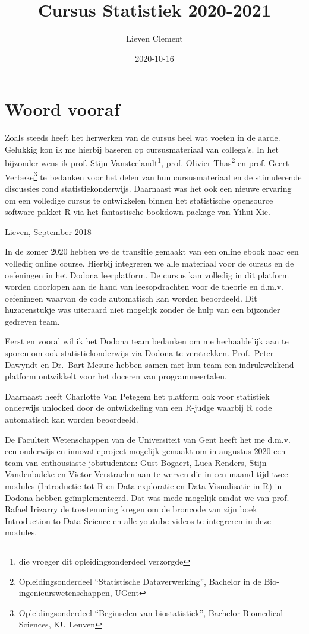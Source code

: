 \documentclass[
  12pt,dutch,coursenotes]{book}
\title{Cursus Statistiek 2020-2021}
\author{Lieven Clement}
\date{2020-10-16}
\theoremstyle{definition}
\theoremstyle{definition}
\theoremstyle{definition}
\theoremstyle{remark}
\begin{document}
\maketitle

{
\setcounter{tocdepth}{1}
\tableofcontents
}
\hypertarget{woord-vooraf}{%
\chapter*{Woord vooraf}\label{woord-vooraf}}

Zoals steeds heeft het herwerken van de cursus heel wat voeten in de aarde. Gelukkig kon ik me hierbij baseren op cursusmateriaal van collega's. In het bijzonder wens ik prof. Stijn Vansteelandt\footnote{die vroeger dit opleidingsonderdeel verzorgde}, prof. Olivier Thas\footnote{Opleidingsonderdeel ``Statistische Dataverwerking'', Bachelor in de Bio-ingenieurswetenschappen, UGent} en prof. Geert Verbeke\footnote{Opleidingsonderdeel ``Beginselen van biostatistiek'', Bachelor Biomedical Sciences, KU Leuven} te bedanken voor het delen van hun cursusmateriaal en de stimulerende discussies rond statistiekonderwijs. Daarnaast was het ook een nieuwe ervaring om een volledige cursus te ontwikkelen binnen het statistische opensource software pakket R via het fantastische bookdown package van Yihui Xie.

Lieven, September 2018

In de zomer 2020 hebben we de transitie gemaakt van een online ebook naar een volledig online course.
Hierbij integreren we alle materiaal voor de cursus en de oefeningen in het Dodona leerplatform.
De cursus kan volledig in dit platform worden doorlopen aan de hand van leesopdrachten voor de theorie en d.m.v. oefeningen waarvan de code automatisch kan worden beoordeeld.
Dit huzarenstukje was uiteraard niet mogelijk zonder de hulp van een bijzonder gedreven team.

Eerst en vooral wil ik het Dodona team bedanken om me herhaaldelijk aan te sporen om ook statistiekonderwijs via Dodona te verstrekken. Prof.~Peter Dawyndt en Dr.~Bart Mesure hebben samen met hun team een indrukwekkend platform ontwikkelt voor het doceren van programmeertalen.

Daarnaast heeft Charlotte Van Petegem het platform ook voor statistiek onderwijs unlocked door de ontwikkeling van een R-judge waarbij R code automatisch kan worden beoordeeld.

De Faculteit Wetenschappen van de Universiteit van Gent heeft het me d.m.v. een onderwijs en innovatieproject mogelijk gemaakt om in augustus 2020 een team van enthousiaste jobstudenten: Gust Bogaert, Luca Renders, Stijn Vandenbulcke en Victor Verstraelen aan te werven die in een maand tijd twee modules (Introductie tot R en Data exploratie en Data Visualisatie in R) in Dodona hebben geïmplementeerd. Dat was mede mogelijk omdat we van prof. Rafael Irizarry de toestemming kregen om de broncode van zijn boek Introduction to Data Science en alle youtube videos te integreren in deze modules.
\end{document}
